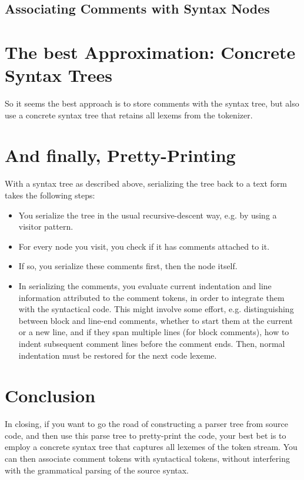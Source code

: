 \documentclass[11pt,a4paper]{article}
\begin{document}
\subsection{Associating Comments with Syntax Nodes}

\section{The best Approximation: Concrete Syntax Trees}

So it seems the best approach is to store comments with the syntax tree, but
also use a concrete syntax tree that retains all lexems from the tokenizer. 

\section{And finally, Pretty-Printing}

With a syntax tree as described above, serializing the tree back to a text form
takes the following steps:

\begin{itemize}
\item You serialize the tree in the usual recursive-descent way, e.g. by using a
visitor pattern.
\item For every node you visit, you check if it has comments attached to it.
\item If so, you serialize these comments first, then the node itself.
\item In serializing the comments, you evaluate current indentation and line
information attributed to the comment tokens, in order to integrate them with
the syntactical code. This might involve some effort, e.g. distinguishing
between block and line-end comments, whether to start them at the current or a
new line, and if they span multiple lines (for block comments), how to indent
subsequent comment lines before the comment ends. Then, normal indentation
must be restored for the next code lexeme.
\end{itemize}

\section{Conclusion}

In closing, if you want to go the road of constructing a parser tree from source
code, and then use this parse tree to pretty-print the code, your best bet is to
employ a concrete syntax tree that captures all lexemes of the token stream. You
can then associate comment tokens with syntactical tokens, without interfering
with the grammatical parsing of the source syntax. 



\end{document}
